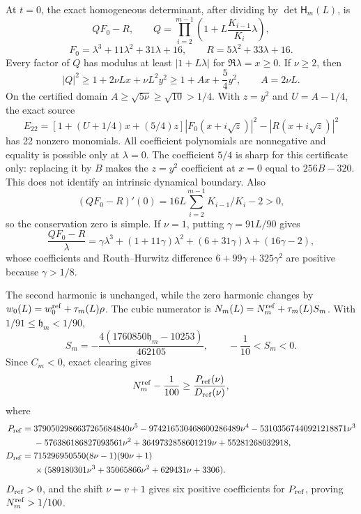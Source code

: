 \documentclass[10pt]{article}
\begin{document}
At $t=0$, the exact homogeneous determinant, after dividing by
$\det\mathsf H_m(L)$, is
\[
 QF_0-R,\qquad
 Q=\prod_{i=2}^{m-1}\left(1+L\frac{K_{i-1}}{K_i}\lambda\right),
\]
\[
 F_0=\lambda^3+11\lambda^2+31\lambda+16,
 \qquad R=5\lambda^2+33\lambda+16.
\]
Every factor of $Q$ has modulus at least $|1+L\lambda|$ for
$\Re\lambda=x\ge0$.  If $\nu\ge2$, then
\[
 |Q|^2\ge1+2\nu Lx+\nu L^2y^2
 \ge1+Ax+\frac54y^2,\qquad A=2\nu L.
\]
On the certified domain $A\ge\sqrt{5\nu}\ge\sqrt{10}>1/4$.
With $z=y^2$ and $U=A-1/4$, the exact source
\[
E_{22}=\left[1+(U+1/4)x+(5/4)z\right]|F_0(x+i\sqrt z)|^2
-|R(x+i\sqrt z)|^2
\]
has 22 nonzero monomials.  All coefficient polynomials are nonnegative and
equality is possible only at $\lambda=0$.  The coefficient $5/4$ is sharp for
this certificate only: replacing it by $B$ makes the $z=y^2$ coefficient at
$x=0$ equal to $256B-320$.  This does not identify an intrinsic dynamical
boundary.  Also
\[
 (QF_0-R)'(0)=16L\sum_{i=2}^{m-1}K_{i-1}/K_i-2>0,
\]
so the conservation zero is simple.  If $\nu=1$, putting
$\gamma=91L/90$ gives
\[
 \frac{QF_0-R}{\lambda}
 =\gamma\lambda^3+(1+11\gamma)\lambda^2
 +(6+31\gamma)\lambda+(16\gamma-2),
\]
whose coefficients and Routh--Hurwitz difference
$6+99\gamma+325\gamma^2$ are positive because $\gamma>1/8$.

The second harmonic is unchanged, while the zero harmonic changes by
$w_0(L)=w_0^{\rm ref}+\tau_m(L)\rho$. The cubic numerator is
$N_m(L)=N_m^{\rm ref}+\tau_m(L)S_m$.  With
$1/91\le\mathfrak h_m<1/90$,
\[
S_m=-\frac{4(1760850\mathfrak h_m-10253)}{462105},
\qquad -\frac1{10}<S_m<0.
\]
Since $C_m<0$, exact clearing gives
\[
N_m^{\rm ref}-\frac1{100}\ge\frac{P_{\rm ref}(\nu)}{D_{\rm ref}(\nu)},
\]
where
\begin{align*}
P_{\rm ref}={}&3790502986637265684840\nu^5
-974216530468600286489\nu^4-53103567440921218871\nu^3\\
&-576386186827093561\nu^2+3649732858601219\nu+55281268032918,\\
D_{\rm ref}={}&715296950550(8\nu-1)(90\nu+1)\\
&\times(589180301\nu^3+35065866\nu^2+629431\nu+3306).
\end{align*}
$D_{\rm ref}>0$, and the shift $\nu=v+1$ gives six positive coefficients for
$P_{\rm ref}$, proving $N_m^{\rm ref}>1/100$.
\end{document}
